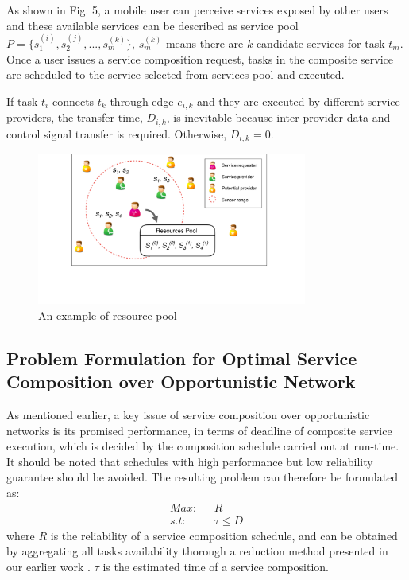 \documentclass[journal]{IEEEtran}
\begin{document}
As shown in Fig. 5, a mobile user can perceive services exposed by other users and these available services can be described as service pool $P = \{s_1^{(i)}, s_2^{(j)}, ..., s_m^{(k)} \}$, $s_m^{(k)}$ means there are $k$ candidate services for task $t_m$. 
Once a user issues a service composition request, tasks in the composite service are scheduled to the service selected from services pool and executed.

If task $t_i$ connects $t_k$ through edge $e_{i,k}$ and they are executed by different service providers, the transfer time, $D_{i,k}$, is inevitable because inter-provider data and control signal transfer is required. Otherwise, $D_{i,k} = 0$.

\begin{figure}[!t]
\centering
\includegraphics[width=3.5in]{./img/pic5.pdf}
\caption{An example of resource pool}
\label{Resource Pool}
\end{figure}

\subsection{Problem Formulation for Optimal Service Composition over Opportunistic Network}

As mentioned earlier, a key issue of service composition over opportunistic networks is its promised performance, in terms of deadline of composite service execution, which is decided by the composition schedule carried out at run-time. It should be noted that schedules with high performance but low reliability guarantee should be avoided. The resulting problem can therefore be formulated as:
\begin{align}
Max    : \ \ \ & R   \\\nonumber
s.t    : \ \ \ & \tau \le D
\end{align}
where $R$ is the reliability of a service composition schedule, and can be obtained by aggregating all tasks availability thorough a reduction method presented in our earlier work \cite{xia2009novel}. $\tau$ is the estimated time of a service composition. 
\end{document}
